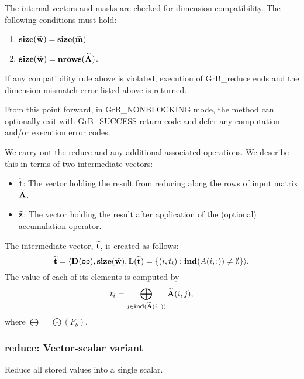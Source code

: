 The internal vectors and masks are checked for dimension compatibility. 
The following conditions must hold:
\begin{enumerate}
	\item $\bold{size}({\bf \widetilde{w}}) = \bold{size}({\bf \widetilde{m}})$
    \item $\bold{size}({\bf \widetilde{w}}) = \bold{nrows}({\bf \widetilde{A}})$.
\end{enumerate}
If any compatibility rule above is violated, execution of {\sf GrB\_reduce} ends and 
the dimension mismatch error listed above is returned.

From this point forward, in {\sf GrB\_NONBLOCKING} mode, the method can 
optionally exit with {\sf GrB\_SUCCESS} return code and defer any computation 
and/or execution error codes.

We carry out the reduce and any additional 
associated operations.  We describe this in terms of two intermediate vectors:
\begin{itemize}
    \item ${\bf \widetilde{t}}$: The vector holding the result from reducing along the rows of input matrix
    ${\bf \widetilde{A}}$.

    \item ${\bf \widetilde{z}}$: The vector holding the result after 
    application of the (optional) accumulation operator.
\end{itemize}

The intermediate vector, ${\bf \widetilde{t}}$, is created as follows:
\[
{\bf \widetilde{t}} = \langle
\bold{D}({\sf op}), \bold{size}({\bf \widetilde{w}}),
\bold{L}({\bf \widetilde{t}}) =
\{(i,t_i) : \bold{ind}(A(i,:)) \neq \emptyset   \} \rangle. 
\]
The value of each of its elements is computed by
\[
	t_i = \bigoplus_{j \in \bold{ind}({\bf \widetilde{A}}(i,:))} {\bf \widetilde{A}}(i,j), 
\]
where $\bigoplus = \bigodot(F_b)$.







\subsubsection{{\sf reduce}: Vector-scalar variant}
\label{Sec:Reduce_vector_scalar}

Reduce all stored values into a single scalar.

